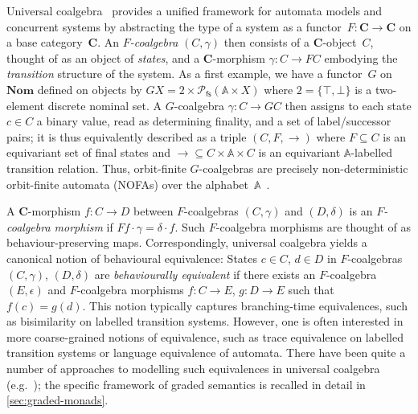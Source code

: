 \documentclass[a4paper,UKenglish,cleveref,thm-restate,numberwithinsect,final]{lipics-v2021}
\newcommand{\fs}{\mathsf{fs}}
\newcommand{\Names}{\mathbb{A}}
\newcommand{\pow}{\mathcal{P}}
\newcommand{\powfs}{\pow_{\fs}}
\theoremstyle{plain}
\numberwithin{equation}{section}
\newcommand{\+}[1]{\mathcal{#1}\xspace}
\newcommand{\Nom}{\mathbf{Nom}}
\newcommand{\BC}{\mathbf{C}}
\theoremstyle{definition}
\begin{document}
Universal coalgebra~\cite{Rutten00} provides a unified framework for
automata models and concurrent systems by abstracting the type of a
system as a functor~$F\colon\BC\to\BC$ on a base category~$\BC$. An
\emph{$F$-coalgebra} $(C,\gamma)$ then consists of a $\BC$-object~$C$,
thought of as an object of \emph{states}, and a $\BC$-morphism
$\gamma\colon C\to FC$ embodying the \emph{transition} structure of
the system. As a first example, we have a functor~$G$ on $\Nom$
defined on objects by $GX=2\times\powfs(\Names\times X)$ where
$2=\{\top,\bot\}$ is a two-element discrete nominal set. A
$G$-coalgebra $\gamma\colon C\to GC$ then assigns to each state
$c\in C$ a binary value, read as determining finality, and a set of
label/successor pairs; it is thus equivalently described as a triple
$(C,F,\to)$ where $F\subseteq C$ is an equivariant set of final states
and ${\to}\subseteq C\times\Names\times C$ is an equivariant
$\Names$-labelled transition relation. Thus, orbit-finite
$G$-coalgebras are precisely non-deterministic orbit-finite automata
(NOFAs) over the alphabet~$\Names$~\cite{BojanczykEA14}.

A $\BC$-morphism $f\colon C\to D$ between $F$-coalgebras $(C,\gamma)$
and $(D,\delta)$ is an \emph{$F$-coalgebra morphism} if
$Ff\cdot\gamma=\delta\cdot f$. Such $F$-coalgebra morphisms are
thought of as behaviour-preserving maps. Correspondingly, universal
coalgebra yields a canonical notion of behavioural equivalence: States
$c\in C$, $d\in D$ in $F$-coalgebras $(C,\gamma)$, $(D,\delta)$ are
\emph{behaviourally equivalent} if there exists an $F$-coalgebra
$(E,\epsilon)$ and $F$-coalgebra morphisms $f\colon C\to E$,
$g\colon D\to E$ such that $f(c)=g(d)$. This notion typically captures
branching-time equivalences, such as bisimilarity on labelled
transition systems. However, one is often interested in more
coarse-grained notions of equivalence, such as trace equivalence on
labelled transition systems or language equivalence of automata. There
have been quite a number of approaches to modelling such equivalences
in universal coalgebra (e.g.~\cite{HasuoEA07,AdamekEA12,MiliusEA15});
the specific framework of graded semantics is recalled in detail in
\cref{sec:graded-monads}.
\end{document}
